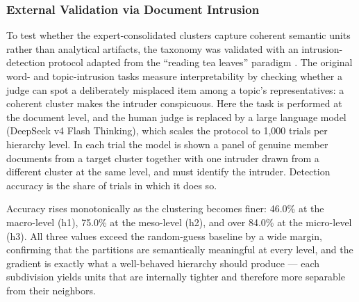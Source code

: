 \documentclass{article}
\let\cite\parencite
\begin{document}
	\subsubsection{External Validation via Document Intrusion}
	\label{intrusion_validation}
	
	To test whether the expert-consolidated clusters capture coherent semantic units rather than analytical artifacts, the taxonomy was validated with an intrusion-detection protocol adapted from the ``reading tea leaves'' paradigm \cite{chang2009reading}. The original word- and topic-intrusion tasks measure interpretability by checking whether a judge can spot a deliberately misplaced item among a topic's representatives: a coherent cluster makes the intruder conspicuous. Here the task is performed at the document level, and the human judge is replaced by a large language model (DeepSeek v4 Flash Thinking), which scales the protocol to 1,000 trials per hierarchy level. In each trial the model is shown a panel of genuine member documents from a target cluster together with one intruder drawn from a different cluster at the same level, and must identify the intruder. Detection accuracy is the share of trials in which it does so.
	
	Accuracy rises monotonically as the clustering becomes finer: 46.0\% at the macro-level (h1), 75.0\% at the meso-level (h2), and over 84.0\% at the micro-level (h3). All three values exceed the random-guess baseline by a wide margin, confirming that the partitions are semantically meaningful at every level, and the gradient is exactly what a well-behaved hierarchy should produce --- each subdivision yields units that are internally tighter and therefore more separable from their neighbors.
	
\end{document}
